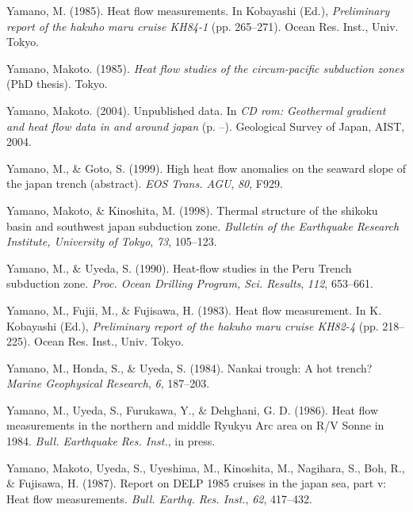 \documentclass[draft,linenumbers]{agujournal2018}
\begin{document}
\leavevmode{}%
Yamano, M. (1985). Heat flow measurements. In Kobayashi (Ed.),
\emph{Preliminary report of the hakuho maru cruise KH84-1} (pp.
265--271). Ocean Res. Inst., Univ. Tokyo.

\leavevmode{}%
Yamano, Makoto. (1985). \emph{Heat flow studies of the circum-pacific
subduction zones} (PhD thesis). Tokyo.

\leavevmode{}%
Yamano, Makoto. (2004). Unpublished data. In \emph{CD rom: Geothermal
gradient and heat flow data in and around japan} (p. --). Geological
Survey of Japan, AIST, 2004.

\leavevmode{}%
Yamano, M., \& Goto, S. (1999). High heat flow anomalies on the seaward
slope of the japan trench (abstract). \emph{EOS Trans. AGU}, \emph{80},
F929.

\leavevmode{}%
Yamano, Makoto, \& Kinoshita, M. (1998). Thermal structure of the
shikoku basin and southwest japan subduction zone. \emph{Bulletin of the
Earthquake Research Institute, University of Tokyo}, \emph{73},
105--123.

\leavevmode{}%
Yamano, M., \& Uyeda, S. (1990). Heat-flow studies in the {Peru Trench}
subduction zone. \emph{Proc. Ocean Drilling Program, Sci. Results},
\emph{112}, 653--661.

\leavevmode{}%
Yamano, M., Fujii, M., \& Fujisawa, H. (1983). Heat flow measurement. In
K. Kobayashi (Ed.), \emph{Preliminary report of the hakuho maru cruise
KH82-4} (pp. 218--225). Ocean Res. Inst., Univ. Tokyo.

\leavevmode{}%
Yamano, M., Honda, S., \& Uyeda, S. (1984). Nankai trough: A hot trench?
\emph{Marine Geophysical Research}, \emph{6}, 187--203.

\leavevmode{}%
Yamano, M., Uyeda, S., Furukawa, Y., \& Dehghani, G. D. (1986). Heat
flow measurements in the northern and middle {Ryukyu Arc} area on {R/V
Sonne} in 1984. \emph{Bull. Earthquake Res. Inst.}, in press.

\leavevmode{}%
Yamano, Makoto, Uyeda, S., Uyeshima, M., Kinoshita, M., Nagihara, S.,
Boh, R., \& Fujisawa, H. (1987). Report on DELP 1985 cruises in the
japan sea, part v: Heat flow measurements. \emph{Bull. Earthq. Res.
Inst.}, \emph{62}, 417--432.
\end{document}
